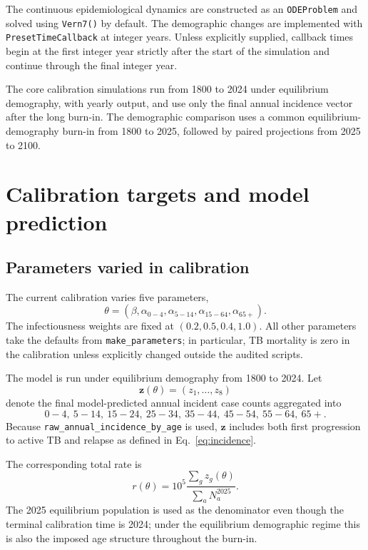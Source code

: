 \documentclass[11pt]{article}
\newcommand{\code}[1]{\texttt{#1}}
\begin{document}
The continuous epidemiological dynamics are constructed as an \code{ODEProblem} and solved using \code{Vern7()} by default. The demographic changes are implemented with \code{PresetTimeCallback} at integer years. Unless explicitly supplied, callback times begin at the first integer year strictly after the start of the simulation and continue through the final integer year.

The core calibration simulations run from 1800 to 2024 under equilibrium demography, with yearly output, and use only the final annual incidence vector after the long burn-in. The demographic comparison uses a common equilibrium-demography burn-in from 1800 to 2025, followed by paired projections from 2025 to 2100.

\section{Calibration targets and model prediction}

\subsection{Parameters varied in calibration}

The current calibration varies five parameters,
\begin{equation}
\theta=(\beta,\alpha_{0-4},\alpha_{5-14},\alpha_{15-64},\alpha_{65+}).
\end{equation}
The infectiousness weights are fixed at $(0.2,0.5,0.4,1.0)$. All other parameters take the defaults from \code{make\_parameters}; in particular, TB mortality is zero in the calibration unless explicitly changed outside the audited scripts.

The model is run under equilibrium demography from 1800 to 2024. Let
\begin{equation}
\mathbf z(\theta)=(z_1,\ldots,z_8)
\end{equation}
denote the final model-predicted annual incident case counts aggregated into
\[
0\!\! -\!\!4,\ 5\!\! -\!\!14,\ 15\!\! -\!\!24,\ 25\!\! -\!\!34,\ 35\!\! -\!\!44,\ 45\!\! -\!\!54,\ 55\!\! -\!\!64,\ 65+.
\]
Because \code{raw\_annual\_incidence\_by\_age} is used, $\mathbf z$ includes both first progression to active TB and relapse as defined in Eq.~\eqref{eq:incidence}.

The corresponding total rate is
\begin{equation}
r(\theta)=10^5\frac{\sum_g z_g(\theta)}{\sum_aN_a^{2025}}.
\label{eq:modelrate}
\end{equation}
The 2025 equilibrium population is used as the denominator even though the terminal calibration time is 2024; under the equilibrium demographic regime this is also the imposed age structure throughout the burn-in.
\end{document}
